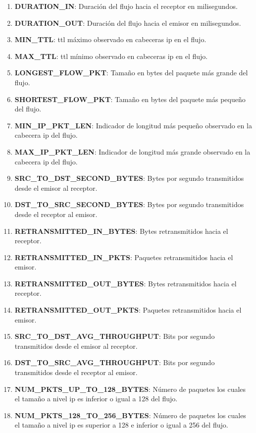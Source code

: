 \begin{enumerate}
    \item \textbf{DURATION\_IN}: Duración del flujo hacia el receptor en milisegundos.
    \item \textbf{DURATION\_OUT}: Duración del flujo hacia el emisor en milisegundos.
    \item \textbf{MIN\_TTL}: \acrshort{ttl} máximo observado en cabeceras \acrshort{ip} en el flujo.
    \item \textbf{MAX\_TTL}: \acrshort{ttl} mínimo observado en cabeceras \acrshort{ip} en el flujo.
    \item \textbf{LONGEST\_FLOW\_PKT}: Tamaño en bytes del paquete más grande del flujo.
    \item \textbf{SHORTEST\_FLOW\_PKT}: Tamaño en bytes del paquete más pequeño del flujo.
    \item \textbf{MIN\_IP\_PKT\_LEN}: Indicador de longitud más pequeño observado en la cabecera \acrshort{ip} del flujo.
    \item \textbf{MAX\_IP\_PKT\_LEN}: Indicador de longitud más grande observado en la cabecera \acrshort{ip} del flujo.
    \item \textbf{SRC\_TO\_DST\_SECOND\_BYTES}: Bytes por segundo transmitidos desde el emisor al receptor.
    \item \textbf{DST\_TO\_SRC\_SECOND\_BYTES}: Bytes por segundo transmitidos desde el receptor al emisor.
    \item \textbf{RETRANSMITTED\_IN\_BYTES}: Bytes retransmitidos hacia el receptor.
    \item \textbf{RETRANSMITTED\_IN\_PKTS}: Paquetes retransmitidos hacia el emisor.
    \item \textbf{RETRANSMITTED\_OUT\_BYTES}: Bytes retransmitidos hacia el receptor.
    \item \textbf{RETRANSMITTED\_OUT\_PKTS}: Paquetes retransmitidos hacia el emisor.
    \item \textbf{SRC\_TO\_DST\_AVG\_THROUGHPUT}: Bits por segundo transmitidos desde el emisor al receptor.
    \item \textbf{DST\_TO\_SRC\_AVG\_THROUGHPUT}: Bits por segundo transmitidos desde el receptor al emisor.
    \item \textbf{NUM\_PKTS\_UP\_TO\_128\_BYTES}: Número de paquetes los cuales el tamaño a nivel \acrshort{ip} es inferior o igual a 128 del flujo.
    \item \textbf{NUM\_PKTS\_128\_TO\_256\_BYTES}: Número de paquetes los cuales el tamaño a nivel \acrshort{ip} es superior a 128 e inferior o igual a 256 del flujo.

\end{enumerate}

